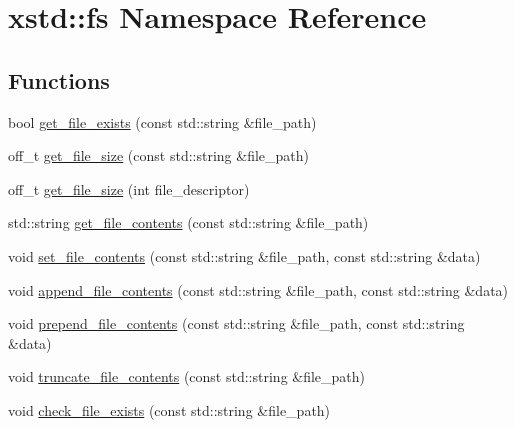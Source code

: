 \hypertarget{namespacexstd_1_1fs}{\section{xstd\-:\-:fs Namespace Reference}
\label{namespacexstd_1_1fs}
}
\subsection*{Functions}
\begin{DoxyCompactItemize}
\item 
bool \hyperlink{namespacexstd_1_1fs_a384ca2272ed5cb2d7559247369734030}{get\-\_\-file\-\_\-exists} (const std\-::string \&file\-\_\-path)
\item 
off\-\_\-t \hyperlink{namespacexstd_1_1fs_abddc66dbad516e9b0bfeadc932e7872b}{get\-\_\-file\-\_\-size} (const std\-::string \&file\-\_\-path)
\item 
off\-\_\-t \hyperlink{namespacexstd_1_1fs_a3360db70ba7ae3638ad9f167661b0385}{get\-\_\-file\-\_\-size} (int file\-\_\-descriptor)
\item 
std\-::string \hyperlink{namespacexstd_1_1fs_a4282f483655e6114043320236ace2485}{get\-\_\-file\-\_\-contents} (const std\-::string \&file\-\_\-path)
\item 
void \hyperlink{namespacexstd_1_1fs_aaaebc4d368b5546f9c4963735020c89d}{set\-\_\-file\-\_\-contents} (const std\-::string \&file\-\_\-path, const std\-::string \&data)
\item 
void \hyperlink{namespacexstd_1_1fs_a748a84e128ba84f9c78fc644dc2b7614}{append\-\_\-file\-\_\-contents} (const std\-::string \&file\-\_\-path, const std\-::string \&data)
\item 
void \hyperlink{namespacexstd_1_1fs_acb898d109b6c16e0d5540d5e054cc1ef}{prepend\-\_\-file\-\_\-contents} (const std\-::string \&file\-\_\-path, const std\-::string \&data)
\item 
void \hyperlink{namespacexstd_1_1fs_a119353947b14c506352a55dae89bffe1}{truncate\-\_\-file\-\_\-contents} (const std\-::string \&file\-\_\-path)
\item 
void \hyperlink{namespacexstd_1_1fs_a5cc17beb220c440ae11af037f8ee8fb6}{check\-\_\-file\-\_\-exists} (const std\-::string \&file\-\_\-path)
\end{DoxyCompactItemize}


